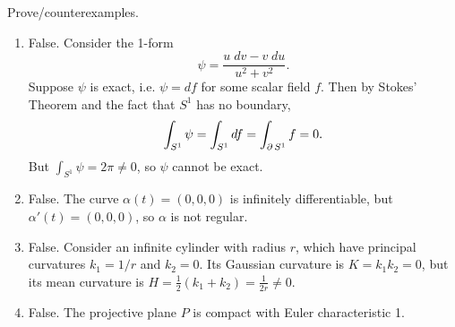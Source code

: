 \documentclass[twoside,10pt]{report}
\begin{document}

\begin{exer}[]
Prove/counterexamples.
\end{exer}
\begin{enumerate}
	\item False. Consider the 1-form
		\[
		\psi= \frac{u\;dv-v\;du}{u^{2}+v^{2}} .
	\] Suppose $\psi$ is exact, i.e. $\psi=df$ for some scalar field $f$. Then by Stokes' Theorem and the fact that $S^{1}$ has no boundary,
		\[
		\int_{S^{1}} \psi = \int_{S^{1}} df = \int_{\operatorname{\partial} S^{1}} f=0.
		\] 
		But $\int_{S^{1}} \psi=2\pi\neq 0$, so $\psi$ cannot be exact.

	\item False. The curve $\alpha(t)=(0,0,0)$ is infinitely differentiable, but $\alpha'(t) = (0,0,0)$, so $\alpha$ is not regular.

	\item False. Consider an infinite cylinder with radius $r$, which have principal curvatures $k_1=1/r$ and $k_2=0$. Its Gaussian curvature is $K=k_1k_2=0$, but its mean curvature is $H=\frac{1}{2} (k_1+k_2) = \frac{1}{2r} \neq 0$.

	\item False. The projective plane $P$ is compact with Euler characteristic 1.
\end{enumerate}
\end{document}
